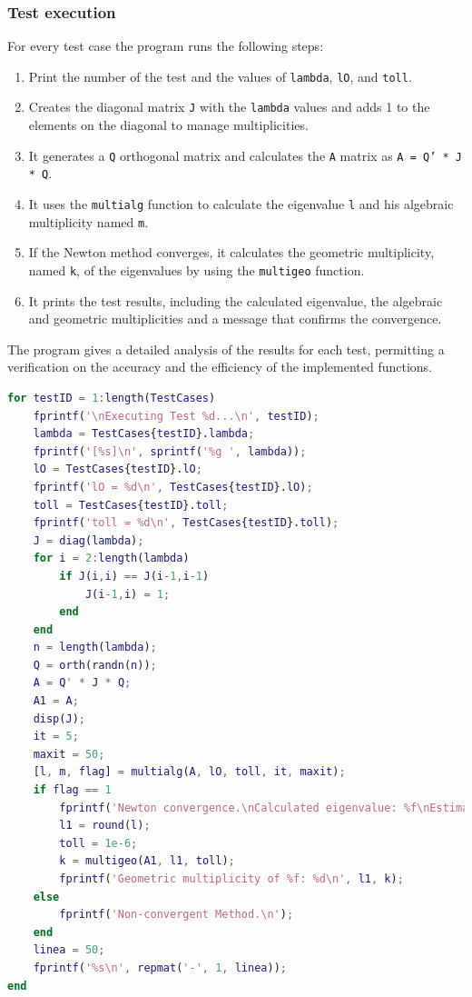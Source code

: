\documentclass[12pt]{article}
\begin{document}
\subsubsection{Test execution}
For every test case the program runs the following steps:
    \begin{enumerate}
        \item Print the number of the test and the values of \texttt{lambda}, \texttt{lO}, and \texttt{toll}.
        \item Creates the diagonal matrix \texttt{J} with the \texttt{lambda} values and adds 1 to the elements on the diagonal to manage multiplicities.
        \item It generates a \texttt{Q} orthogonal matrix and calculates the \texttt{A} matrix as \texttt{A = Q' * J * Q}.
        \item It uses the \texttt{multialg} function to calculate the eigenvalue \texttt{l} and his algebraic multiplicity named \texttt{m}.
        \item If the Newton method converges, it calculates the geometric multiplicity, named \texttt{k}, of the eigenvalues by using the \texttt{multigeo} function.
        \item It prints the test results, including  the calculated eigenvalue, the algebraic and geometric multiplicities and a message that confirms the convergence.
    \end{enumerate}
    The program gives a detailed analysis of the results for each test, permitting a verification on the accuracy and the efficiency of the implemented functions. 
    \newpage
\begin{lstlisting}[language=Matlab, frame=single, caption={Esecuzione dei test}, captionpos=b]
for testID = 1:length(TestCases)
    fprintf('\nExecuting Test %d...\n', testID);    
    lambda = TestCases{testID}.lambda;
    fprintf('[%s]\n', sprintf('%g ', lambda));
    lO = TestCases{testID}.lO;
    fprintf('lO = %d\n', TestCases{testID}.lO);
    toll = TestCases{testID}.toll;
    fprintf('toll = %d\n', TestCases{testID}.toll);
    J = diag(lambda);
    for i = 2:length(lambda)
        if J(i,i) == J(i-1,i-1)
            J(i-1,i) = 1;
        end
    end
    n = length(lambda);
    Q = orth(randn(n)); 
    A = Q' * J * Q;
    A1 = A;
    disp(J);     
    it = 5;
    maxit = 50;
    [l, m, flag] = multialg(A, lO, toll, it, maxit);
    if flag == 1
        fprintf('Newton convergence.\nCalculated eigenvalue: %f\nEstimated algebraic multiplicity: %d\n', l, m);
        l1 = round(l);
        toll = 1e-6;
        k = multigeo(A1, l1, toll);
        fprintf('Geometric multiplicity of %f: %d\n', l1, k);
    else
        fprintf('Non-convergent Method.\n');
    end
    linea = 50;
    fprintf('%s\n', repmat('-', 1, linea));
end
\end{lstlisting}
\newpage
\end{document}
